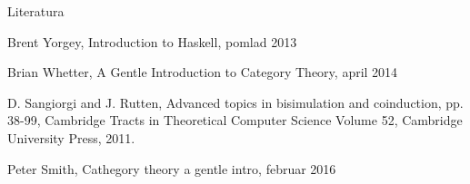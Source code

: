 \documentclass[t,usenames,dvipsnames]{beamer} %
\begin{document}
		
\begin{frame}{Literatura}


	\begin{thebibliography}{99}
		  Brent Yorgey, Introduction to Haskell,
		pomlad 2013
		
		 Brian Whetter, A Gentle Introduction to Category Theory,
		april 2014
		
		 D. Sangiorgi and J. Rutten, Advanced topics in bisimulation and coinduction, pp. 38-99, Cambridge Tracts in Theoretical Computer Science Volume 52, Cambridge University Press, 2011. 
		

		 Peter Smith, Cathegory theory a gentle intro,
		februar 2016


		
		
		
	\end{thebibliography}
\end{frame}
\end{document}
